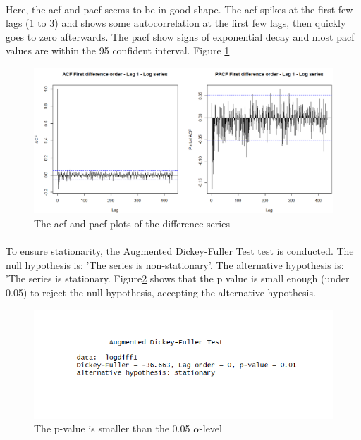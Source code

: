 \documentclass[12pt]{article}
\begin{document}
\paragraph{}
Here, the acf and pacf seems to be in good shape. The acf spikes at the first few lags (1 to 3)  and shows some autocorrelation at the first few lags, then quickly goes to zero afterwards. The pacf show signs of exponential decay and most pacf values are within the 95 confident interval. Figure \ref{fig:figure7}
\begin{figure}[H]
  \includegraphics[width=\linewidth]{figure7.png}
  \caption{The acf and pacf plots of the difference series}
  \label{fig:figure7}
\end{figure}

\paragraph{}
To ensure stationarity, the Augmented Dickey-Fuller Test test is conducted. The null hypothesis is: 'The series is non-stationary'. The alternative hypothesis is: 'The series is stationary. Figure\ref{fig:figure8}  shows that the p value is small enough (under 0.05) to reject the null hypothesis, accepting the alternative hypothesis. 
\begin{figure}[H]
  \includegraphics[width=\linewidth]{figure8.png}
  \caption{The p-value is smaller than the 0.05 $\alpha$-level }
  \label{fig:figure8}
\end{figure}
\end{document}
